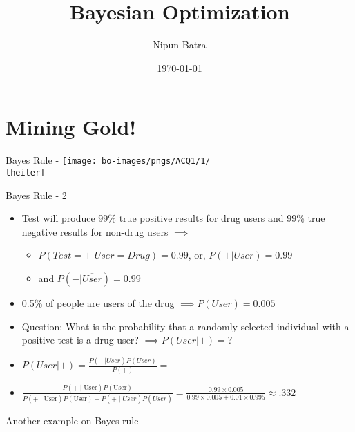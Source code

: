 \documentclass{beamer}
\title{Bayesian Optimization}
\date{\today}
\author{Nipun Batra}
\institute{IIT Gandhinagar}
\begin{document}
  \maketitle
  
  
\section{Mining Gold!}
%
{%
	\begin{frame}{Bayes Rule - \theiter}
		\texttt{[image: bo-images/pngs/ACQ1/1/\\theiter]}
	\end{frame}
}

\begin{frame}{Bayes Rule - 2}
\begin{itemize}
	
\item Test will produce 99\% true positive results for drug users and 99\% true negative results for non-drug users $\implies$
\begin{itemize}
	\item $P(Test=+|User=Drug) = 0.99$, or, $P(+|User) = 0.99$
	\item and $P(-|\overline{User}) =0.99$ 
\end{itemize}  
		\item 0.5\% of people are users of the drug $\implies P(User) = 0.005$
		\item Question: What is the probability that a randomly selected individual with a positive test is a drug user? $\implies P(User|+) = ?$
		\item 
				$P(User|+) = \frac{P(+|User)P(User)}{P(+)} = $
		\item $\frac{P(\text{+}\mid\text{User}) P(\text{User})}{P(\text{+}\mid\text{User}) P(\text{User}) + P(\text{+}\mid\overline{User}) P(\overline{User})} = \frac{0.99\times 0.005}{0.99\times 0.005 + 0.01\times0.995} \approx .332$ 
	
\end{itemize}
\end{frame}

\begin{frame}{Another example on Bayes rule}
\end{frame}
\end{document}
